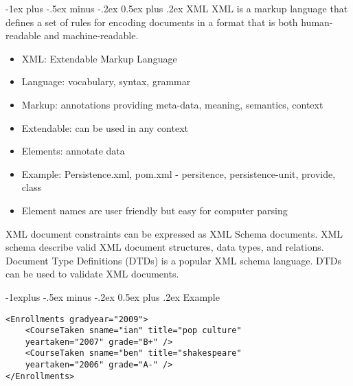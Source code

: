 \documentclass[10pt,landscape]{article}
\makeatletter
\renewcommand{\section}{\@startsection{section}{1}{0mm}%
                                {-1ex plus -.5ex minus -.2ex}%
                                {0.5ex plus .2ex}%
                                {\normalfont\large\bfseries}}
\renewcommand{\subsection}{\@startsection{subsection}{2}{0mm}%
                                {-1explus -.5ex minus -.2ex}%
                                {0.5ex plus .2ex}%
                                {\normalfont\normalsize\bfseries}}
\makeatother
\begin{document}
\begin{multicols}{3}
\section{XML}
XML is a markup language that defines a set of rules for encoding documents in a format that is both human-readable and machine-readable. \\
\begin{itemize}
    \item XML: Extendable Markup Language
    \item Language: vocabulary, syntax, grammar
    \item Markup: annotations providing meta-data, meaning, semantics, context
    \item Extendable: can be used in any context
    \item Elements: annotate data
    \item Example: Persistence.xml, pom.xml - persitence, persistence-unit, provide, class
    \item Element names are user friendly but easy for computer parsing
\end{itemize}

XML document constraints can be expressed as XML Schema documents. 
XML schema describe valid XML document structures, data types, and relations.
Document Type Definitions (DTDs) is a popular XML schema language.
DTDs can be used to validate XML documents.


\subsection{Example}

\begin{lstlisting}
<Enrollments gradyear="2009">
	<CourseTaken sname="ian" title="pop culture"
	yeartaken="2007" grade="B+" />
	<CourseTaken sname="ben" title="shakespeare"
	yeartaken="2006" grade="A-" />
</Enrollments>
\end{lstlisting}


\end{multicols}
\end{document}
